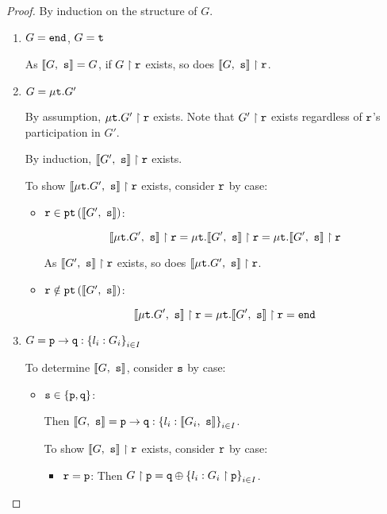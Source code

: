 \begin{proof}
By induction on the structure of $G$.

\begin{enumerate}

\item $G = \tend$, $G = \trecvar$

As $\enc{G}{s} = G$, if $\proj{G}{r}$ exists, 
so does $\proj{ \enc{G}{s} }{r}$.

\item $G = \trec{G'}$

By assumption, $\proj{\trec{G'}}{r}$ exists.
Note that $\proj{G'}{r}$ exists regardless of $\mrole{r}$'s
participation in $G'$.

By induction, $\proj{\enc{G'}{s}}{r}$ exists.

To show $\proj{\enc{\trec{G'}}{s}}{r}$ exists,
consider $\mrole{r}$ by case:

\begin{itemize}
\item $\mrole{r} \in \pt{\enc{G'}{s}}$:

\[
\proj{\enc{\trec{G'}}{s}}{r}
= \proj{\trec{\enc{G'}{s}}}{r}
= \trec{\proj{\enc{G'}{s}}{r}}
\]

As $\proj{\enc{G'}{s}}{r}$ exists,
so does $\proj{\enc{\trec{G'}}{s}}{r}$.

\item $\mrole{r} \notin \pt{\enc{G'}{s}}$:

\[
\proj{\enc{\trec{G'}}{s}}{r}
= \proj{\trec{\enc{G'}{s}}}{r}
= \tend
\]

\end{itemize}

\item $G = \gcomm{p}{q}{l_i: G_i}{i \in I}$

To determine $\enc{G}{s}$, consider $\mrole{s}$ by case:

\begin{itemize}

\item $\mrole{s} \in \{ \mrole{p}, \mrole{q} \}$:

Then $\enc{G}{s} = \gcomm{p}{q}{l_i: \enc{G_i}{s}}{i \in I}$.

To show $\proj{\enc{G}{s}}{r}$ exists,
consider $\mrole{r}$ by case:

\begin{itemize}
\item $\mrole{r} = \mrole{p}$:
Then $\proj{G}{p} = \tsel{q}{l_i: \proj{G_i}{p}}{i \in I}$.


\end{itemize}
\end{itemize}
\end{enumerate}
\end{proof}
